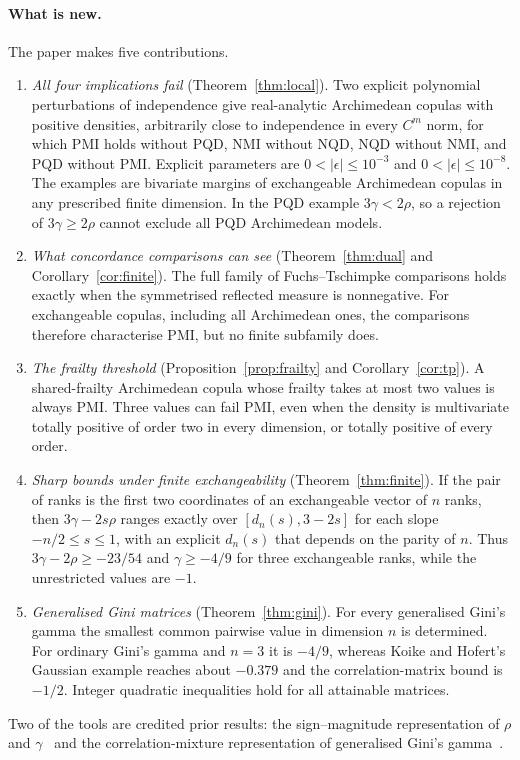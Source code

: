 \documentclass[11pt,a4paper]{article}
\theoremstyle{remark}
\begin{document}
\paragraph{What is new.} The paper makes five contributions.
\begin{enumerate}
\item \emph{All four implications fail} (Theorem~\ref{thm:local}). Two explicit polynomial perturbations of independence give real-analytic Archimedean copulas with positive densities, arbitrarily close to independence in every $C^m$ norm, for which PMI holds without PQD, NMI without NQD, NQD without NMI, and PQD without PMI. Explicit parameters are $0<|\epsilon|\leq10^{-3}$ and $0<|\epsilon|\leq10^{-8}$. The examples are bivariate margins of exchangeable Archimedean copulas in any prescribed finite dimension. In the PQD example $3\gamma<2\rho$, so a rejection of $3\gamma\geq2\rho$ cannot exclude all PQD Archimedean models.
\item \emph{What concordance comparisons can see} (Theorem~\ref{thm:dual} and Corollary~\ref{cor:finite}). The full family of Fuchs--Tschimpke comparisons holds exactly when the symmetrised reflected measure is nonnegative. For exchangeable copulas, including all Archimedean ones, the comparisons therefore characterise PMI, but no finite subfamily does.
\item \emph{The frailty threshold} (Proposition~\ref{prop:frailty} and Corollary~\ref{cor:tp}). A shared-frailty Archimedean copula whose frailty takes at most two values is always PMI. Three values can fail PMI, even when the density is multivariate totally positive of order two in every dimension, or totally positive of every order.
\item \emph{Sharp bounds under finite exchangeability} (Theorem~\ref{thm:finite}). If the pair of ranks is the first two coordinates of an exchangeable vector of $n$ ranks, then $3\gamma-2s\rho$ ranges exactly over $[d_n(s),3-2s]$ for each slope $-n/2\leq s\leq1$, with an explicit $d_n(s)$ that depends on the parity of $n$. Thus $3\gamma-2\rho\geq-23/54$ and $\gamma\geq-4/9$ for three exchangeable ranks, while the unrestricted values are $-1$.
\item \emph{Generalised Gini matrices} (Theorem~\ref{thm:gini}). For every generalised Gini's gamma the smallest common pairwise value in dimension $n$ is determined. For ordinary Gini's gamma and $n=3$ it is $-4/9$, whereas Koike and Hofert's Gaussian example reaches about $-0.379$ and the correlation-matrix bound is $-1/2$. Integer quadratic inequalities hold for all attainable matrices.
\end{enumerate}
Two of the tools are credited prior results: the sign--magnitude representation of $\rho$ and $\gamma$~\cite[Lemma~3.1]{ars} and the correlation-mixture representation of generalised Gini's gamma~\cite[Theorem~3]{kh}.
\end{document}
